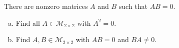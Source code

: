\begin{exercise}
  \label{ex:hw02:zero-products}
  There are nonzero matrices \(A\) and \(B\) such that \(AB=0\).
  \begin{enumerate}[(a)][2]
    \item Find all \(A\in\mathcal M_{2\times2}\) with \(A^2=0\).
    \item Find \(A,B\in\mathcal M_{2\times2}\) with \(AB=0\) and
      \(BA\ne0\).
  \end{enumerate}
\end{exercise}
